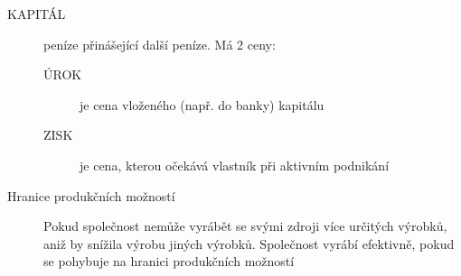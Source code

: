 \documentclass[12pt,a4paper,twoside]{book}
\begin{document}
\begin{description}
	\item[KAPITÁL] peníze přinášející další peníze. Má 2 ceny:
		\begin{description}
			\item[ÚROK] je cena vloženého (např. do banky) kapitálu
			\item[ZISK] je cena, kterou očekává vlastník při aktivním podnikání		
		\end{description}
	\item[Hranice produkčních možností] Pokud společnost nemůže vyrábět se svými zdroji více určitých výrobků, aniž by snížila výrobu jiných výrobků. Společnost vyrábí efektivně, pokud se pohybuje na hranici produkčních možností
\end{description}
\end{document}
